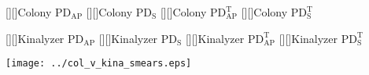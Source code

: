 \documentclass[11pt]{article}
\newcommand{\PDS}{\mathrm{PD_S}}
\newcommand{\PDST}{\mathrm{PD_S^T}}
\newcommand{\W}{\mathrm{PD_{AP}}} %
\newcommand{\WT}{\mathrm{PD_{AP}^T}}
\begin{document}
\pagestyle{empty}

\begin{center}
[][]{{\sf Colony} $\W$}
[][]{{\sf Colony} $\PDS$}
[][]{{\sf Colony} $\WT$}
[][]{{\sf Colony} $\PDST$}

[][]{{\sf Kinalyzer} $\W$}
[][]{{\sf Kinalyzer} $\PDS$}
[][]{{\sf Kinalyzer} $\WT$}
[][]{{\sf Kinalyzer} $\PDST$}

\texttt{[image: ../col\_v\_kina\_smears.eps]}

\end{center}




 
\end{document}

